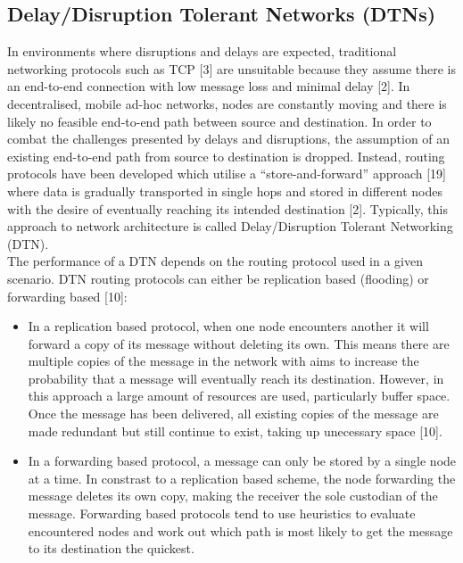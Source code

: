 \documentclass{article}
\begin{document}
\subsection{Delay/Disruption Tolerant Networks (DTNs)}
In environments where disruptions and delays are expected, traditional networking protocols such as TCP [3] are unsuitable because they assume there is an end-to-end connection with low message loss and minimal delay [2]. In decentralised, mobile ad-hoc networks, nodes are constantly moving and there is likely no feasible end-to-end path between source and destination. In order to combat the challenges presented by delays and disruptions, the assumption of an existing end-to-end path from source to destination is dropped. Instead, routing protocols have been developed which utilise a ``store-and-forward'' approach [19] where data is gradually transported in single hops and stored in different nodes with the desire of eventually reaching its intended destination [2]. Typically, this approach to network architecture is called Delay/Disruption Tolerant Networking (DTN).\\
\noindent The performance of a DTN depends on the routing protocol used in a given scenario. DTN routing protocols can either be replication based (flooding) or forwarding based [10]:\\
\begin{itemize}
	\item In a replication based protocol, when one node encounters another it will forward a copy of its message without deleting its own. This means there are multiple copies of the message in the network with aims to increase the probability that a message will eventually reach its destination. However, in this approach a large amount of resources are used, particularly buffer space. Once the message has been delivered, all existing copies of the message are made redundant but still continue to exist, taking up unecessary space [10].
	\item In a forwarding based protocol, a message can only be stored by a single node at a time. In constrast to a replication based scheme, the node forwarding the message deletes its own copy, making the receiver the sole custodian of the message. Forwarding based protocols tend to use heuristics to evaluate encountered nodes and work out which path is most likely to get the message to its destination the quickest.
\end{itemize}
\end{document}
